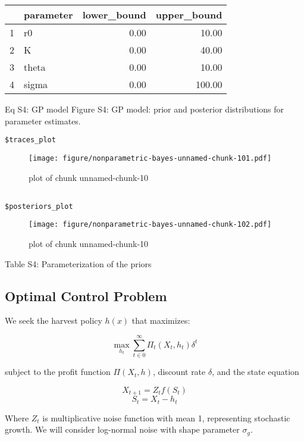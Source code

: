 \documentclass[author-year, review]{elsarticle} %
\makeatletter
\def\maxwidth{\ifdim\Gin@nat@width>\linewidth\linewidth
\else\Gin@nat@width\fi}
\let\Oldincludegraphics\includegraphics
\renewcommand{\includegraphics}[1]{\Oldincludegraphics[width=\maxwidth]{#1}}
\makeatother
\begin{document}
\begin{table}[ht]
\centering
\begin{tabular}{rlrr}
  \hline
 & parameter & lower\_bound & upper\_bound \\ 
  \hline
1 & r0 & 0.00 & 10.00 \\ 
  2 & K & 0.00 & 40.00 \\ 
  3 & theta & 0.00 & 10.00 \\ 
  4 & sigma & 0.00 & 100.00 \\ 
   \hline
\end{tabular}
\end{table}

Eq S4: GP model Figure S4: GP model: prior and posterior distributions
for parameter estimates.

\begin{verbatim}
$traces_plot
\end{verbatim}

\begin{figure}[htbp]
\centering
\texttt{[image: figure/nonparametric-bayes-unnamed-chunk-101.pdf]}
\caption{plot of chunk unnamed-chunk-10}
\end{figure}

\begin{verbatim}

$posteriors_plot
\end{verbatim}

\begin{figure}[htbp]
\centering
\texttt{[image: figure/nonparametric-bayes-unnamed-chunk-102.pdf]}
\caption{plot of chunk unnamed-chunk-10}
\end{figure}

Table S4: Parameterization of the priors

\subsection{Optimal Control Problem}\label{optimal-control-problem}

We seek the harvest policy $h(x)$ that maximizes:

\[ \max_{h_t} \sum_{t \in 0}^{\infty}  \Pi_t(X_t, h_t) \delta^t  \]

subject to the profit function $\Pi(X_t,h)$, discount rate $\delta$, and
the state equation

\[X_{t+1} = Z_t f(S_t)  \] \[S_t = X_t - h_t \]

Where $Z_t$ is multiplicative noise function with mean 1, representing
stochastic growth. We will consider log-normal noise with shape
parameter $\sigma_g$.
\end{document}
